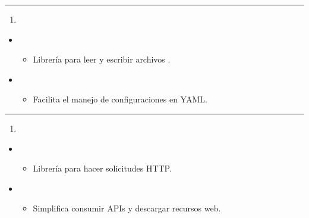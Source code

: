 \documentclass[a4paper,10pt,spanish]{sphinxmanual}
\begin{document}
\bigskip\hrule\bigskip

\begin{enumerate}
%
\setcounter{enumi}{24}
\item {} 
\sphinxAtStartPar
{}

\end{enumerate}
\begin{itemize}
\item {} 
\sphinxAtStartPar
{}
\begin{itemize}
\item {} 
\sphinxAtStartPar
Librería para leer y escribir archivos .

\end{itemize}

\item {} 
\sphinxAtStartPar
{}
\begin{itemize}
\item {} 
\sphinxAtStartPar
Facilita el manejo de configuraciones en YAML.

\end{itemize}

\end{itemize}


\bigskip\hrule\bigskip

\begin{enumerate}
%
\setcounter{enumi}{25}
\item {} 
\sphinxAtStartPar
{}

\end{enumerate}
\begin{itemize}
\item {} 
\sphinxAtStartPar
{}
\begin{itemize}
\item {} 
\sphinxAtStartPar
Librería para hacer solicitudes HTTP.

\end{itemize}

\item {} 
\sphinxAtStartPar
{}
\begin{itemize}
\item {} 
\sphinxAtStartPar
Simplifica consumir APIs y descargar recursos web.

\end{itemize}

\end{itemize}
\end{document}
